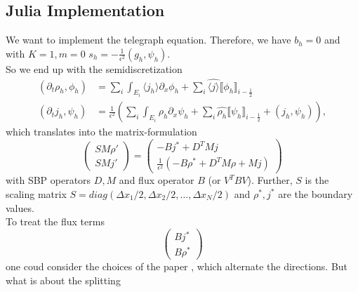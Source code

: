 \subsection{Julia Implementation}
We want to implement the telegraph equation. 
Therefore, we have $b_h=0$ and with $K=1, m=0$ $s_h=-\frac{1}{\epsilon^2}(g_h,\psi_h)$.\\
So we end up with the semidiscretization 
\begin{align*}
(\partial_t\rho_h, \phi_h)&=\sum\limits_i \int_{E_i} \langle j_h \rangle \partial_x \phi_h + \sum_{i} \widehat{\langle j \rangle} \llbracket \phi_h \rrbracket_{i-\frac{1}{2}}\\
(\partial_t j_h, \psi_h)&= \frac{1}{\epsilon^2}\left(\sum_i \int_{E_i} \rho_h \partial_x \psi_h + \sum_i \widehat{ \rho_h} \llbracket \psi_h \rrbracket_{i - \frac{1}{2}} + \left(j_h, \psi_h\right)\right),
\end{align*}
which translates into the matrix-formulation
\begin{equation*}
    \begin{pmatrix}
        SM \rho' \\
        SM j'
    \end{pmatrix} =
    \begin{pmatrix}
        -Bj^*+D^TMj \\
        \frac{1}{\epsilon^2}\left(-B\rho^*+D^TM\rho + Mj\right)
    \end{pmatrix}
\end{equation*}
with SBP operators $D, M$ and flux operator $B$ (or $V^TBV$). Further, $S$ is the scaling matrix $S=diag(\Delta x_1/2, \Delta x_2/2, \hdots, \Delta x_N/2)$ and $\rho^*, j^*$ are the boundary values.\\
To treat the flux terms
\begin{equation*}
\begin{pmatrix}
    Bj^* \\
    B\rho^*
\end{pmatrix}
\end{equation*}
one coud consider the choices of the paper \cite{JaLiQiXi2014}, which alternate the directions. But what is about the splitting

